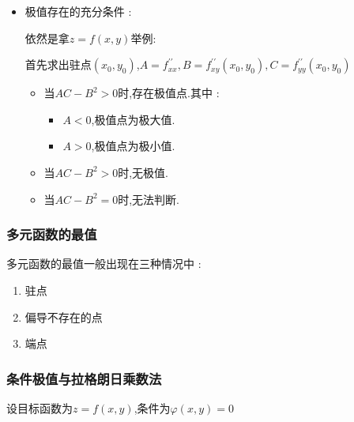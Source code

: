 \documentclass[UTF8,12pt]{ctexbook}
\newcommand{\derivative}{^\prime}
\newcommand{\doubleDerivative}{^{\prime\prime}}
\newcommand{\defFunction}[1]{f(#1)}
\begin{document}
{{{{\begin{itemize}
{            如果$z = \defFunction{x,y}$有偏导且在$(x_0,y_0)$存在极值,则$f\derivative_x(x_0,y_0) = 0,f\derivative_y(x_0,y_0) = 0$

            驻点此时指偏导等于0的点,即$f\derivative_x = f\derivative_y = 0$(需要同时成立).

            有偏导数的函数极值点必是驻点.但是函数的驻点不一定是极值点.
            }
      \item {
            极值存在的充分条件 :

            依然是拿$z = \defFunction{x,y}$举例:

            首先求出驻点$(x_0,y_0)$,$A = f\doubleDerivative_{xx},B = f\doubleDerivative_{xy}(x_0,y_0),C = f\doubleDerivative_{yy}(x_0,y_0)$

            \begin{itemize}
              \item {当$AC-B^2 > 0$时,存在极值点.其中 :
                    \begin{itemize}
                      \item $A < 0$,极值点为极大值.
                      \item $A > 0$,极值点为极小值.
                    \end{itemize}
                    }
              \item 当$AC - B^2 > 0$时,无极值.
              \item 当$AC - B^2 = 0$时,无法判断.
            \end{itemize}
            }
    \end{itemize}
  }%

  \subsubsection{多元函数的最值}{
    多元函数的最值一般出现在三种情况中 :

    \begin{enumerate}
      \item 驻点
      \item 偏导不存在的点
      \item 端点
    \end{enumerate}
  }%

  \subsubsection{条件极值与拉格朗日乘数法}{
    设目标函数为$z = \defFunction{x,y}$,条件为$\varphi(x,y) = 0$

}}}}
\end{document}
